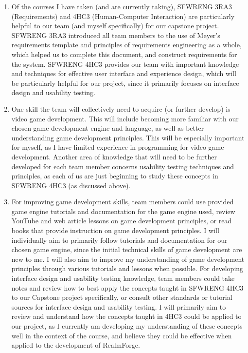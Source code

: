 \documentclass{scrreprt}
\theoremstyle{definition}
\begin{document}
\begin{enumerate}
		Additionally, the environment requirement included concerning the 
		operating system RealmForge will support was influenced by discussions 
		with peers that could be included in our user groups (those who play 
		video games and are familiar the roguelite genre, those who are not, 
		etc.). It was found (as expected) that most users tend to play PC video 
		games on machines running modern Windows operating systems, as they are 
		most commonly available and easy to configure to play popular video 
		games.
		\item Of the courses I have taken (and are currently taking), SFWRENG 
		3RA3 (Requirements) and 4HC3 (Human-Computer Interaction) are 
		particularly helpful to our team (and myself specifically) for our 
		capstone project. SFWRENG 3RA3 introduced all team members to the use 
		of Meyer's requirements template and principles of requirements 
		engineering as a whole, which helped us to complete this document, and 
		construct requirements for the system. SFWRENG 4HC3 provides our team 
		with important knowledge and techniques for effective user interface 
		and experience design, which will be particularly helpful for our 
		project, since it primarily focuses on interface design and usability 
		testing.
		\item One skill the team will collectively need to acquire (or further 
		develop) is video game development. This will include becoming more 
		familiar with our chosen game development engine and language, as well 
		as better understanding game development principles. This will be 
		especially important for myself, as I have limited experience in 
		programming for video game development. Another area of knowledge that 
		will need to be further developed for each team member concerns 
		usability testing techniques and principles, as each of us are just 
		beginning to study these concepts in SFWRENG 4HC3 (as discussed above).
		\item For improving game development skills, team members could use 
		provided game engine tutorials and documentation for the game engine 
		used, review YouTube and web article lessons on game development 
		principles, or read books that provide instruction on game development 
		principles. I will individually aim to primarily follow tutorials and 
		documentation for our chosen game engine, since the initial technical 
		skills of game development are new to me. I will also aim to improve my 
		understanding of game development principles through various tutorials 
		and lessons when possible. For developing interface design and 
		usability testing knowledge, team members could take notes and review 
		how to best apply the concepts taught in SFWRENG 4HC3 to our Capstone 
		project specifically, or consult other standards or tutorial sources 
		for interface design and usability testing. I will primarily aim to 
		review and understand how the concepts taught in 4HC3 could be applied 
		to our project, as I currently am developing my understanding of these 
		concepts well in the context of the course, and believe they could be 
		effective when applied to the development of RealmForge.
	\end{enumerate}
	
\end{document}
